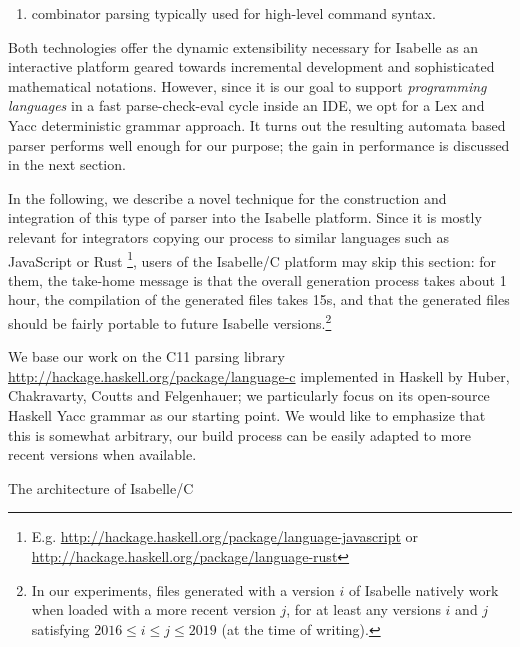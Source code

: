 \begin{isabellebody}
\begin{isamarkuptext}
\begin{enumerate}
\item combinator parsing \cite{DBLP:journals/jfp/Hutton92} typically used for high-level 
command syntax.%
\end{enumerate}%
\end{isamarkuptext}\isamarkuptrue%
%
\begin{isamarkuptext}%
Both technologies offer the dynamic extensibility necessary for Isabelle as an
interactive platform geared towards incremental development and sophisticated mathematical
notations. However, since it is our goal to support \emph{programming languages} in
a fast parse-check-eval cycle inside an IDE, we opt for a Lex and Yacc deterministic grammar
approach. It turns out the resulting automata based parser performs well enough for our purpose; the
gain in performance is discussed in the next section.%
\end{isamarkuptext}\isamarkuptrue%
%
\begin{isamarkuptext}%
In the following, we describe a novel technique for the construction and integration of
this type of parser into the Isabelle platform. Since it is mostly relevant for integrators copying
our process to similar languages such as JavaScript or Rust \footnote{E.g.
\url{http://hackage.haskell.org/package/language-javascript} or
\url{http://hackage.haskell.org/package/language-rust}}, users of the
Isabelle/C platform may skip this section: for them, the take-home message is that the overall
generation process takes about 1 hour, the compilation of the generated files takes 15s, and that
the generated files should be fairly portable to future Isabelle versions.\footnote{In our
  experiments, files generated with a version $i$ of Isabelle natively work when loaded with a more
  recent version $j$, for at least any versions $i$ and $j$ satisfying $2016 \leq i \leq j \leq
  2019$ (at the time of writing).}%
\end{isamarkuptext}\isamarkuptrue%
%
\begin{isamarkuptext}%
We base our work on the C11 parsing library
  \url{http://hackage.haskell.org/package/language-c} implemented in Haskell by
Huber, Chakravarty, Coutts and Felgenhauer; we particularly focus on its open-source Haskell Yacc
grammar as our starting point. We would like to emphasize that this is somewhat arbitrary, our build
process can be easily adapted to more recent versions when available.%
\end{isamarkuptext}\isamarkuptrue%
%
\begin{isamarkupfigure*}%
[label = {architecture},type = {Isa_COL.figure}, args={label = {architecture},type = {Isa_COL.figure}, Isa_COL.figure.relative_width = {70}, Isa_COL.figure.src = {figures/C11-Package-Architecture}, Isa_COL.figure.spawn_columns = {True}}]The architecture of Isabelle/C%

\end{isamarkupfigure*}
\end{isabellebody}
